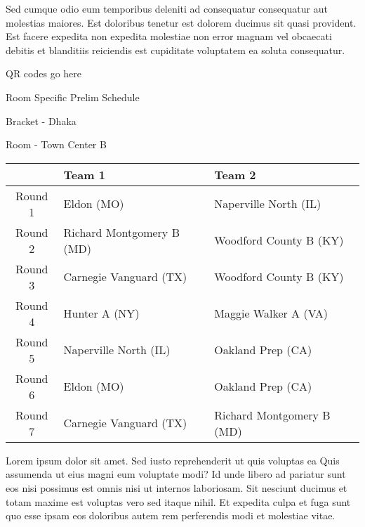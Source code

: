 \documentclass{article}%
\begin{document}
\newline%
Sed cumque odio eum temporibus deleniti ad consequatur consequatur aut molestias maiores. Est doloribus tenetur est dolorem ducimus sit quasi provident. Est facere expedita non expedita molestiae non error magnam vel obcaecati debitis et blanditiis reiciendis est cupiditate voluptatem ea soluta consequatur.%
\vspace*{140pt}%
\begin{center}%
\begin{Huge}%
QR codes go here%
\end{Huge}%
\end{center}%
\newpage%
\begin{center}%
\begin{Huge}%
Room Specific Prelim Schedule%
\end{Huge}%
\vspace*{8pt}%
\linebreak%
\begin{Large}%
Bracket {-} Dhaka%
\end{Large}%
\vspace*{8pt}%
\linebreak%
\vspace*{8pt}%
\begin{Large}%
Room {-} Town Center B%
\end{Large}%
\end{center}%
%
\begin{tabularx}{\textwidth}{|c|Y|Y|}%
\hline%
&Team 1&Team 2\\%
\hline%
Round 1&Eldon (MO)&Naperville North (IL)\\%
Round 2&Richard Montgomery B (MD)&Woodford County B (KY)\\%
Round 3&Carnegie Vanguard (TX)&Woodford County B (KY)\\%
Round 4&Hunter A (NY)&Maggie Walker A (VA)\\%
Round 5&Naperville North (IL)&Oakland Prep (CA)\\%
Round 6&Eldon (MO)&Oakland Prep (CA)\\%
Round 7&Carnegie Vanguard (TX)&Richard Montgomery B (MD)\\%
\hline%
\end{tabularx}%
\vspace*{8pt}%
\newline%
Lorem ipsum dolor sit amet. Sed iusto reprehenderit ut quis voluptas ea Quis assumenda ut eius magni eum voluptate modi? Id unde libero ad pariatur sunt eos nisi possimus est omnis nisi ut internos laboriosam. Sit nesciunt ducimus et totam maxime est voluptas vero sed itaque nihil. Et expedita culpa et fuga sunt quo esse ipsam eos doloribus autem rem perferendis modi et molestiae vitae.\newline%
\end{document}

